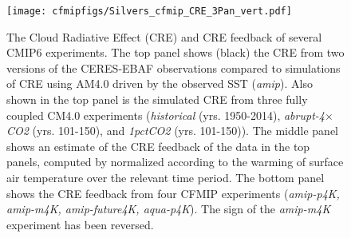 \documentclass[draft]{agujournal2019}
\begin{document}

\begin{figure}
  \centering
  \texttt{[image: cfmipfigs/Silvers\_cfmip\_CRE\_3Pan\_vert.pdf]}
  \caption{The Cloud Radiative Effect (CRE) and CRE feedback of several CMIP6 experiments.  The top panel 
  shows (black) the CRE from two versions of the CERES-EBAF observations compared to 
  simulations of CRE using AM4.0 driven by the observed SST (\textit{amip}).  Also 
  shown in the top panel is the simulated CRE from three fully coupled CM4.0 experiments (\textit{historical} (yrs. 1950-2014),
  \textit{abrupt-4$\times$CO2} (yrs. 101-150), and \textit{1pctCO2} (yrs. 101-150)).  The middle panel shows an estimate of the 
  CRE feedback of the data in the top panels, computed by normalized according to the warming of surface air temperature over 
  the relevant time period.  The bottom panel shows the CRE feedback from four 
  CFMIP experiments (\textit{amip-p4K, amip-m4K, amip-future4K, aqua-p4K}).  The sign of the \textit{amip-m4K} experiment has 
  been reversed.}
  \label{fig:CRE_feedback}
\end{figure}    
\end{document}
